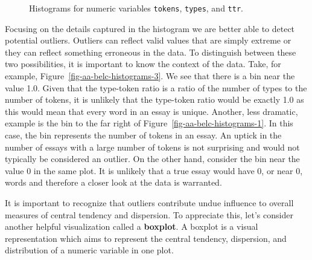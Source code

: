\documentclass[
  letterpaper,
]{latex/krantz}
\theoremstyle{definition}
\theoremstyle{remark}
\begin{document}
\begin{figure}[H]
\begin{minipage}{0.33\linewidth}
{}


\end{minipage}%

\caption{\label{fig-aa-belc-histograms}Histograms for numeric variables
\texttt{tokens}, \texttt{types}, and \texttt{ttr}.}

\end{figure}%

Focusing on the details captured in the histogram we are better able to
detect potential outliers. Outliers can reflect valid values that are
simply extreme or they can reflect something erroneous in the data. To
distinguish between these two possibilities, it is important to know the
context of the data. Take, for example,
Figure~\ref{fig-aa-belc-histograms-3}. We see that there is a bin near
the value 1.0. Given that the type-token ratio is a ratio of the number
of types to the number of tokens, it is unlikely that the type-token
ratio would be exactly 1.0 as this would mean that every word in an
essay is unique. Another, less dramatic, example is the bin to the far
right of Figure~\ref{fig-aa-belc-histograms-1}. In this case, the bin
represents the number of tokens in an essay. An uptick in the number of
essays with a large number of tokens is not surprising and would not
typically be considered an outlier. On the other hand, consider the bin
near the value 0 in the same plot. It is unlikely that a true essay
would have 0, or near 0, words and therefore a closer look at the data
is warranted.

It is important to recognize that outliers contribute undue influence to
overall measures of central tendency and dispersion. To appreciate this,
let's consider another helpful visualization called a \textbf{boxplot}.
A boxplot is a visual representation which aims to represent the central
tendency, dispersion, and distribution of a numeric variable in one
plot.
\end{document}
